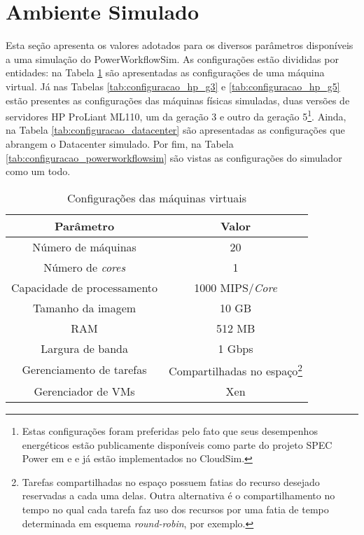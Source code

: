 \section{Ambiente Simulado}
\label{sec:ambiente_simulado}
Esta seção apresenta os valores adotados para os diversos parâmetros disponíveis
a uma simulação do PowerWorkflowSim. As configurações estão divididas
por entidades: na Tabela \ref{tab:configuracao_vm} são apresentadas as
configurações de uma máquina virtual. Já nas Tabelas \ref{tab:configuracao_hp_g3}
e \ref{tab:configuracao_hp_g5} estão presentes as configurações das máquinas
físicas simuladas, duas versões de servidores HP ProLiant ML110, um da geração 3
e outro da geração 5\footnote{Estas configurações foram preferidas pelo fato que 
seus desempenhos energéticos estão publicamente disponíveis como parte do
projeto SPEC Power em \cite{spec:proliant_ml110_g3} e
\cite{spec:proliant_ml110_g5} e já estão implementados no CloudSim.}. Ainda, na
Tabela \ref{tab:configuracao_datacenter} são apresentadas as configurações que
abrangem o Datacenter simulado. Por fim, na Tabela
\ref{tab:configuracao_powerworkflowsim} são vistas as configurações
do simulador como um todo.

\begin{savenotes}
\begin{table}[ht]
	\centering
    \begin{tabular}{|c|c|}
    \hline
    \textbf{Parâmetro}     & \textbf{Valor}     \\ \hline
    Número de máquinas     & 20        \\
    Número de \emph{cores} & 1         \\
    Capacidade de processamento  & 1000 MIPS/\emph{Core} \\
    Tamanho da imagem      & 10 GB  \\
    RAM                    & 512 MB    \\
    Largura de banda       & 1 Gbps \\
    Gerenciamento de tarefas & Compartilhadas no espaço\footnote{Tarefas
    compartilhadas no espaço possuem fatias do recurso desejado
    reservadas a cada uma delas. Outra alternativa é o compartilhamento no tempo
    no qual cada tarefa faz uso dos recursos por uma fatia de tempo
    determinada em esquema \emph{round-robin}, por exemplo.} \\
    Gerenciador de VMs     & Xen       \\     \hline
    \end{tabular}
    \caption {Configurações das máquinas virtuais}
    \label{tab:configuracao_vm}
\end{table}
\end{savenotes}

